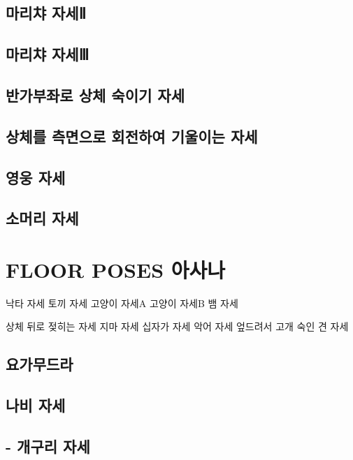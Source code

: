 \documentclass[12pt, a4paper, oneside]{book}
\let\stdsection\section
\renewcommand\section{\newpage\stdsection}
\begin{document}
		\section{	마리챠 자세Ⅱ}
		\section{	마리챠 자세Ⅲ}
		\section{	반가부좌로 상체 숙이기 자세}
		\section{	상체를 측면으로 회전하여 기울이는 자세}
		\section{	영웅 자세}
		\section{	소머리 자세}


	\chapter{FLOOR POSES 아사나}
	\newpage
	\minitoc

	낙타 자세
	토끼 자세
	고양이 자세A
	고양이 자세B
	뱀 자세

	상체 뒤로 젖히는 자세
	지마 자세
	십자가 자세
	악어 자세
	엎드려서 고개 숙인 견 자세

		\section{요가무드라}
		\section{나비 자세}


		\section{ - 개구리 자세 }
\end{document}
